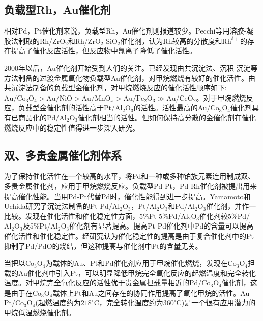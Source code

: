 \subsection{负载型\rm{Rh}，\rm{Au}催化剂}
相对\textrm{Pd}，\textrm{Pt}催化剂来说，负载型\textrm{Rh}\cite{CataD83-71_2003}，\textrm{Au}催化剂则报道较少。\textrm{Pecchi}等\cite{JCTB74-897_1999}用溶胶-凝胶法制取的\textrm{Rh}/$\mathrm{ZrO}_2$和\textrm{Rh}/$\mathrm{ZrO}_2$-$\mathrm{SiO}_2$催化剂，认为\textrm{Rh}较高的分散度和$\mathrm{Rh}^{\delta+}$的存在提高了催化反应活性，但反应物中氯离子降低了催化活性。

2000年以后，\textrm{Au}催化剂开始受到人们的关注。已经发现由共沉淀法、沉积-沉淀等方法制备的过渡金属氧化物负载型\textrm{Au}催化剂，对甲烷燃烧有较好的催化活性\cite{JCata191-430_2000,CataD64-69_2001}。由共沉淀法制备的负载型金催化剂，对甲烷燃烧反应的催化活性顺序如下:~$\mathrm{Au}/\mathrm{Co}_3\mathrm{O}_4>\mathrm{Au}/\mathrm{NiO}>\mathrm{Au}/\mathrm{MnO}_x>\mathrm{Au}/\mathrm{Fe}_2\mathrm{O}_3\gg\mathrm{Au}/\mathrm{CeO}_2$。对于甲烷燃烧反应，负载型金催化剂的活性高于\textrm{Pt}/$\mathrm{Al}_2\mathrm{O}_3$的活性。活性最高的\textrm{Au}/$\mathrm{Co}_3\mathrm{O}_4$催化剂具有已商品化的\textrm{Pd}/$\mathrm{Al}_2\mathrm{O}_3$催化剂相当的活性。但如何保持高分散的金催化剂在催化燃烧反应中的稳定性值得进一步深入研究。

\subsection{双、多贵金属催化剂体系}
为了保持催化活性在一个较高的水平，将\textrm{Pd}和一种或多种铂族元素连用制成双、多贵金属催化剂，应用于甲烷燃烧反应。负载型\textrm{Pd}-\textrm{Pt}，\textrm{Pd}-\textrm{Rh}\cite{ACA226-281_2002,CataT83-265_2003}催化剂被提出用来提高催化性能。当用\textrm{Pd}-\textrm{Pt}代替\textrm{Pd}时，催化性能得到进一步提高。\textrm{Yamamoto}和\textrm{Uchida}\cite{CataD45-147_1998}研究了沉淀法制备的\textrm{Pt}-\textrm{Pd}/$\mathrm{Al}_2\mathrm{O}_3$，Pt/$\mathrm{Al}_2\mathrm{O}_3$和Pd/$\mathrm{Al}_2\mathrm{O}_3$催化剂，并作一比较。发现在催化活性和催化稳定性方面，5\%\textrm{Pt}-5\%\textrm{Pd}/$\mathrm{Al}_2\mathrm{O}_3$催化剂较5\%\textrm{Pd}/$\mathrm{Al}_2\mathrm{O}_3$及5\%\textrm{Pt}/$\mathrm{Al}_2\mathrm{O}_3$催化剂有显著提高。提高\textrm{Pt}-\textrm{Pd}催化剂中\textrm{Pd}的含量可以提高催化活性和催化稳定性。经研究认为催化稳定性的提高是由于复合催化剂中的\textrm{Pt}抑制了\textrm{Pd}/\textrm{PdO}的烧结，但这种提高与催化剂中\textrm{Pt}的含量无关。

当把以$\mathrm{Co}_3\mathrm{O}_4$为载体的\textrm{Au}、\textrm{Pt}和\textrm{Pd}催化剂应用于甲烷催化燃烧\cite{ACB31-L1_2001}，发现在$\mathrm{Co}_3\mathrm{O}_4$担载的\textrm{Au}催化剂中引入\textrm{Pt}，可以明显降低甲烷完全氧化反应的起燃温度和完全转化温度。对甲烷完全氧化反应的活性优于贵金属担载量相近的\textrm{Pd}/$\mathrm{Co}_3\mathrm{O}_4$催化剂，这是由于在$\mathrm{Co}_3\mathrm{O}_4$载体上\textrm{Pt}和\textrm{Au}之间存在的协同作用提高了氧化甲烷的活性。\textrm{Au}-\textrm{Pt}/$\mathrm{Co}_3\mathrm{O}_4$(起燃温度约为$218^{\circ}\mathrm{C}$，完全转化温度约为$360^{\circ}\mathrm{C}$)是一个很有应用潜力的甲烷低温燃烧催化剂。

